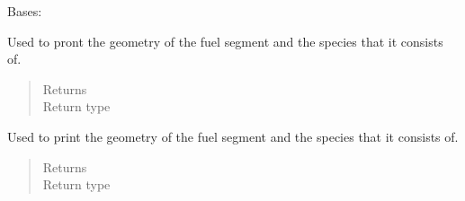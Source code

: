 \documentclass[letterpaper,10pt,openany,oneside,english]{sphinxmanual}
\begin{document}
\begin{fulllineitems}
\label{\detokenize{support_rst/fuel_segment:fuel_segment.FuelSegment}}
Bases: 

\begin{fulllineitems}
\label{\detokenize{support_rst/fuel_segment:fuel_segment.FuelSegment.__repr__}}
Used to pront the geometry of the fuel segment and the species that it
consists of.
\begin{quote}\begin{description}
\item[{Returns}] \leavevmode
{}

\item[{Return type}] \leavevmode
{}

\end{description}\end{quote}

\end{fulllineitems}


\begin{fulllineitems}
\label{\detokenize{support_rst/fuel_segment:fuel_segment.FuelSegment.__str__}}
Used to print the geometry of the fuel segment and the species that it
consists of.
\begin{quote}\begin{description}
\item[{Returns}] \leavevmode
{}

\item[{Return type}] \leavevmode
{}

\end{description}\end{quote}

\end{fulllineitems}


\end{fulllineitems}
\end{document}

